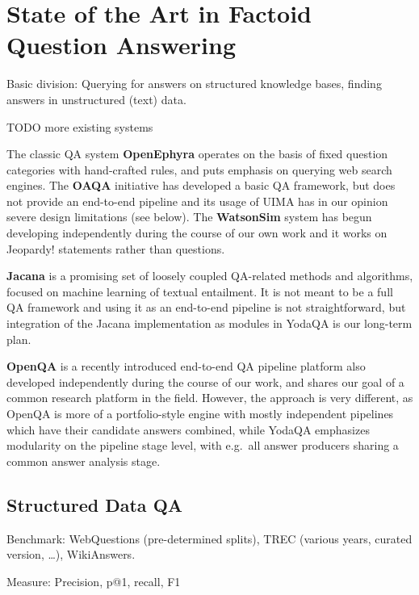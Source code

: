 \chapter{State of the Art in Factoid Question Answering}
\label{ch:survey}

Basic division:  Querying for answers on structured knowledge bases,
finding answers in unstructured (text) data.

TODO more existing systems

The classic QA system \textbf{OpenEphyra} \cite{Ephyra2006}
operates on the basis of fixed question categories with hand-crafted rules,
and puts emphasis on querying web search engines.
The \textbf{OAQA} initiative \cite{OAQATowards} has developed a basic QA framework,
but does not provide an end-to-end pipeline and its usage of UIMA has
in our opinion severe design limitations (see below).
The \textbf{WatsonSim} system \cite{WatsonSim} has begun developing independently
during the course of our own work and it works on Jeopardy! statements rather
than questions.

\textbf{Jacana} \cite{TreeEdit2013Yao} \cite{TreeEditIR2013Yao}
is a promising set of loosely coupled QA-related methods
and algorithms, focused on machine learning of textual entailment.  It is
not meant to be a full QA framework and using it as an end-to-end pipeline
is not straightforward, but integration of the Jacana implementation as
modules in YodaQA is our long-term plan.

\textbf{OpenQA} \cite{OpenQA} is a recently introduced end-to-end QA pipeline platform
also developed independently during the course of our work, and shares our
goal of a common research platform in the field.  However, the approach
is very different, as OpenQA is more of a portfolio-style engine with
mostly independent pipelines which have their candidate answers combined,
while YodaQA emphasizes modularity on the pipeline stage level,
with e.g.\ all answer producers sharing a common answer analysis stage.



\section{Structured Data QA}

Benchmark:  WebQuestions (pre-determined splits), TREC (various years, curated version, \dots), WikiAnswers.

Measure: Precision, p@1, recall, F1

